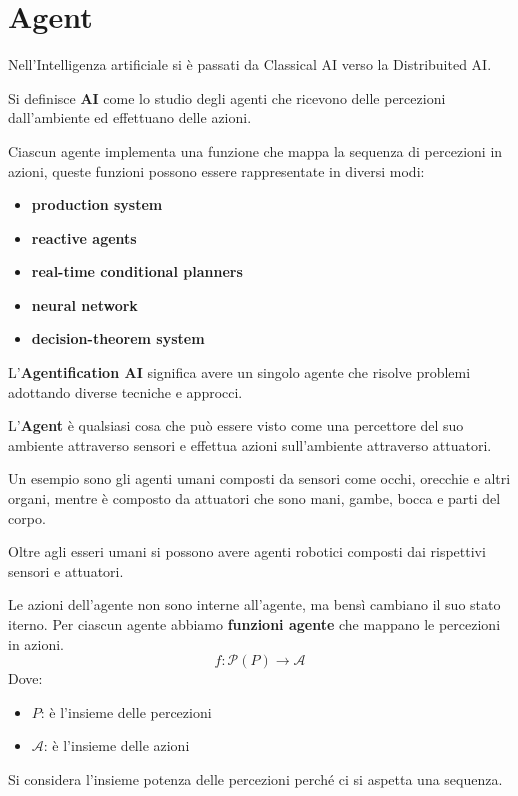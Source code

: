 \chapter{Agent}
Nell'Intelligenza artificiale si è passati da Classical AI verso la Distribuited
AI.

\begin{definizione}[\textbf{AI}]
    Si definisce \textbf{AI} come lo studio degli agenti che ricevono delle 
    percezioni dall'ambiente ed effettuano delle azioni.
\end{definizione}
Ciascun agente implementa una funzione che mappa la sequenza di percezioni in azioni,
queste funzioni possono essere rappresentate in diversi modi:
\begin{itemize}
    \item \textbf{production system}
    \item \textbf{reactive agents}
    \item \textbf{real-time conditional planners}
    \item \textbf{neural network}
    \item \textbf{decision-theorem system}
\end{itemize}

\begin{definizione}
    L'\textbf{Agentification AI} significa avere un singolo agente che risolve
    problemi adottando diverse tecniche e approcci.
\end{definizione}

\begin{definizione}
    L'\textbf{Agent} è qualsiasi cosa che può essere visto come una percettore del 
    suo ambiente attraverso sensori e effettua azioni sull'ambiente attraverso attuatori.
\end{definizione}

\begin{esempio}
    Un esempio sono gli agenti umani composti da sensori come occhi, orecchie e altri
    organi, mentre è composto da attuatori che sono mani, gambe, bocca e parti del corpo.

    Oltre agli esseri umani si possono avere agenti robotici composti dai rispettivi
    sensori e attuatori.
\end{esempio}


Le azioni dell'agente non sono interne all'agente, ma bensì cambiano
il suo stato iterno. Per ciascun agente abbiamo \textbf{funzioni agente} che mappano 
le percezioni in azioni.
$$f:\mathcal{P}(P)\rightarrow \mathcal{A}$$
Dove:
\begin{itemize}
    \item $P$: è l'insieme delle percezioni
    \item $\mathcal{A}$: è l'insieme delle azioni
\end{itemize}
Si considera l'insieme potenza delle percezioni perché ci si aspetta una sequenza.

